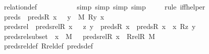 \begin{isabellebody}
\ relation{}{\isacharunderscore}{\kern0pt}def\ \isanewline
\ \ \ \ \ \ \ \ \isamarkupfalse%
\ {\isacharparenleft}{\kern0pt}simp{\isacharcomma}{\kern0pt}\ simp{\isacharcomma}{\kern0pt}\ simp{\isacharcomma}{\kern0pt}\ simp{\isacharparenright}{\kern0pt}\isanewline
\ \ \ \ \isamarkupfalse%
{\isacharparenleft}{\kern0pt}rule\ iff{\isacharunderscore}{\kern0pt}helper{\isacharparenright}{\kern0pt}\isanewline
{}\isamarkupfalse%
%
\endisatagproof
{\isafoldproof}%
%
\isadelimproof
\ \isanewline
%
\endisadelimproof
\isanewline
{}\isamarkupfalse%
\ preds\ \ {\isachardoublequoteopen}preds{\isacharparenleft}{\kern0pt}R{\isacharcomma}{\kern0pt}\ x{\isacharparenright}{\kern0pt}\ {\isasymequiv}\ {\isacharbraceleft}{\kern0pt}\ y\ {\isasymin}\ M{\isachardot}{\kern0pt}\ R{\isacharparenleft}{\kern0pt}y{\isacharcomma}{\kern0pt}\ x{\isacharparenright}{\kern0pt}\ {\isacharbraceright}{\kern0pt}{\isachardoublequoteclose}\ \isanewline
{}\isamarkupfalse%
\ preds{\isacharunderscore}{\kern0pt}rel\ \ {\isachardoublequoteopen}preds{\isacharunderscore}{\kern0pt}rel{\isacharparenleft}{\kern0pt}R{\isacharcomma}{\kern0pt}\ x{\isacharparenright}{\kern0pt}\ {\isasymequiv}\ {\isacharbraceleft}{\kern0pt}\ {\isacharless}{\kern0pt}z{\isacharcomma}{\kern0pt}\ y{\isachargreater}{\kern0pt}\ {\isasymin}\ preds{\isacharparenleft}{\kern0pt}R{\isacharcomma}{\kern0pt}\ x{\isacharparenright}{\kern0pt}\ {\isasymtimes}\ {\isacharparenleft}{\kern0pt}preds{\isacharparenleft}{\kern0pt}R{\isacharcomma}{\kern0pt}\ x{\isacharparenright}{\kern0pt}\ {\isasymunion}\ {\isacharbraceleft}{\kern0pt}x{\isacharbraceright}{\kern0pt}{\isacharparenright}{\kern0pt}{\isachardot}{\kern0pt}\ R{\isacharparenleft}{\kern0pt}z{\isacharcomma}{\kern0pt}\ y{\isacharparenright}{\kern0pt}\ {\isacharbraceright}{\kern0pt}{\isachardoublequoteclose}\ \isanewline
\isanewline
{}\isamarkupfalse%
\ preds{\isacharunderscore}{\kern0pt}rel{\isacharunderscore}{\kern0pt}subset\ {\isacharcolon}{\kern0pt}\ {\isachardoublequoteopen}x\ {\isasymin}\ M\ {\isasymLongrightarrow}\ \ preds{\isacharunderscore}{\kern0pt}rel{\isacharparenleft}{\kern0pt}R{\isacharcomma}{\kern0pt}\ x{\isacharparenright}{\kern0pt}\ {\isasymsubseteq}\ Rrel{\isacharparenleft}{\kern0pt}R{\isacharcomma}{\kern0pt}\ M{\isacharparenright}{\kern0pt}{\isachardoublequoteclose}\ \isanewline
%
\isadelimproof
\ \ %
\endisadelimproof
%
\isatagproof
{}\isamarkupfalse%
\ preds{\isacharunderscore}{\kern0pt}rel{\isacharunderscore}{\kern0pt}def\ Rrel{\isacharunderscore}{\kern0pt}def\ preds{\isacharunderscore}{\kern0pt}def\ \isamarkupfalse%

\end{isabellebody}
